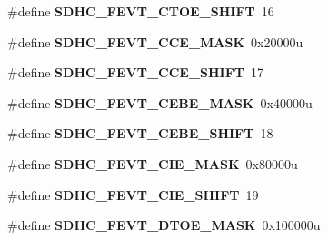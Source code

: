 \begin{DoxyCompactItemize}
\item 
\hypertarget{group___s_d_h_c___register___masks_ga3e2cf2283cca7b5b5e6c61c92df6bcd6}{}\#define {\bfseries S\+D\+H\+C\+\_\+\+F\+E\+V\+T\+\_\+\+C\+T\+O\+E\+\_\+\+S\+H\+I\+F\+T}~16\label{group___s_d_h_c___register___masks_ga3e2cf2283cca7b5b5e6c61c92df6bcd6}

\item 
\hypertarget{group___s_d_h_c___register___masks_ga78a1d9a0fbc16e86deafa9caad24f19c}{}\#define {\bfseries S\+D\+H\+C\+\_\+\+F\+E\+V\+T\+\_\+\+C\+C\+E\+\_\+\+M\+A\+S\+K}~0x20000u\label{group___s_d_h_c___register___masks_ga78a1d9a0fbc16e86deafa9caad24f19c}

\item 
\hypertarget{group___s_d_h_c___register___masks_ga9776fd49381a062a66adc38bec98d758}{}\#define {\bfseries S\+D\+H\+C\+\_\+\+F\+E\+V\+T\+\_\+\+C\+C\+E\+\_\+\+S\+H\+I\+F\+T}~17\label{group___s_d_h_c___register___masks_ga9776fd49381a062a66adc38bec98d758}

\item 
\hypertarget{group___s_d_h_c___register___masks_ga0d8b77f77f69ea2af8a8a6fe5162c0af}{}\#define {\bfseries S\+D\+H\+C\+\_\+\+F\+E\+V\+T\+\_\+\+C\+E\+B\+E\+\_\+\+M\+A\+S\+K}~0x40000u\label{group___s_d_h_c___register___masks_ga0d8b77f77f69ea2af8a8a6fe5162c0af}

\item 
\hypertarget{group___s_d_h_c___register___masks_gaf981263c00f8808cfcde0ff564529bcc}{}\#define {\bfseries S\+D\+H\+C\+\_\+\+F\+E\+V\+T\+\_\+\+C\+E\+B\+E\+\_\+\+S\+H\+I\+F\+T}~18\label{group___s_d_h_c___register___masks_gaf981263c00f8808cfcde0ff564529bcc}

\item 
\hypertarget{group___s_d_h_c___register___masks_ga3c29789497e34050f12d49b5f8424531}{}\#define {\bfseries S\+D\+H\+C\+\_\+\+F\+E\+V\+T\+\_\+\+C\+I\+E\+\_\+\+M\+A\+S\+K}~0x80000u\label{group___s_d_h_c___register___masks_ga3c29789497e34050f12d49b5f8424531}

\item 
\hypertarget{group___s_d_h_c___register___masks_ga86ac6629356f3a89fbd8c06167abfac9}{}\#define {\bfseries S\+D\+H\+C\+\_\+\+F\+E\+V\+T\+\_\+\+C\+I\+E\+\_\+\+S\+H\+I\+F\+T}~19\label{group___s_d_h_c___register___masks_ga86ac6629356f3a89fbd8c06167abfac9}

\item 
\hypertarget{group___s_d_h_c___register___masks_ga6c5de59c47a6627c08013e5e5af04943}{}\#define {\bfseries S\+D\+H\+C\+\_\+\+F\+E\+V\+T\+\_\+\+D\+T\+O\+E\+\_\+\+M\+A\+S\+K}~0x100000u\label{group___s_d_h_c___register___masks_ga6c5de59c47a6627c08013e5e5af04943}


\end{DoxyCompactItemize}

